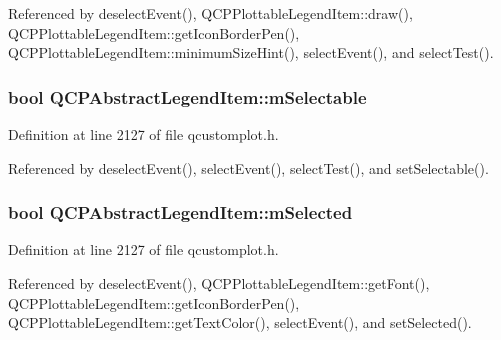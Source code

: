 Referenced by deselect\+Event(), Q\+C\+P\+Plottable\+Legend\+Item\+::draw(), Q\+C\+P\+Plottable\+Legend\+Item\+::get\+Icon\+Border\+Pen(), Q\+C\+P\+Plottable\+Legend\+Item\+::minimum\+Size\+Hint(), select\+Event(), and select\+Test().

\hypertarget{class_q_c_p_abstract_legend_item_aa84029f57b1b32f642fb7db63c3fc2c2}{}
\subsubsection[{m\+Selectable}]{\setlength{\rightskip}{0pt plus 5cm}bool Q\+C\+P\+Abstract\+Legend\+Item\+::m\+Selectable\hspace{0.3cm}{\ttfamily [protected]}}\label{class_q_c_p_abstract_legend_item_aa84029f57b1b32f642fb7db63c3fc2c2}


Definition at line 2127 of file qcustomplot.\+h.



Referenced by deselect\+Event(), select\+Event(), select\+Test(), and set\+Selectable().

\hypertarget{class_q_c_p_abstract_legend_item_ae58ebebbd0c36cc6fe897483369984d2}{}
\subsubsection[{m\+Selected}]{\setlength{\rightskip}{0pt plus 5cm}bool Q\+C\+P\+Abstract\+Legend\+Item\+::m\+Selected\hspace{0.3cm}{\ttfamily [protected]}}\label{class_q_c_p_abstract_legend_item_ae58ebebbd0c36cc6fe897483369984d2}


Definition at line 2127 of file qcustomplot.\+h.



Referenced by deselect\+Event(), Q\+C\+P\+Plottable\+Legend\+Item\+::get\+Font(), Q\+C\+P\+Plottable\+Legend\+Item\+::get\+Icon\+Border\+Pen(), Q\+C\+P\+Plottable\+Legend\+Item\+::get\+Text\+Color(), select\+Event(), and set\+Selected().

\hypertarget{class_q_c_p_abstract_legend_item_ab971df604306b192875a7d097feb1e21}{}
